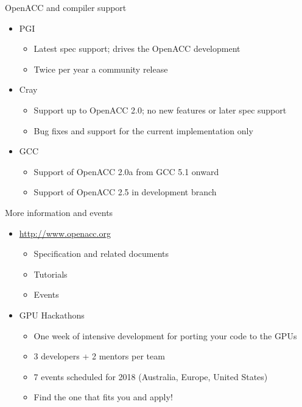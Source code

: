 \documentclass[12pt,aspectratio=169]{beamer}
\begin{document}
\begin{frame}{OpenACC and compiler support}
  \begin{itemize}
  \item PGI
    \begin{itemize}
    \item Latest spec support; drives the OpenACC development
    \item Twice per year a community release
    \end{itemize}
  \item Cray
    \begin{itemize}
    \item Support up to OpenACC 2.0; no new features or later spec support
    \item Bug fixes and support for the current implementation only
    \end{itemize}
  \item GCC
    \begin{itemize}
    \item Support of OpenACC 2.0a from GCC 5.1 onward
    \item Support of OpenACC 2.5 in development branch
    \end{itemize}
  \end{itemize}
\end{frame}

\begin{frame}{More information and events}
  \begin{itemize}
  \item \url{http://www.openacc.org}
    \begin{itemize}
    \item Specification and related documents
    \item Tutorials
    \item Events
    \end{itemize}
    \vfill
  \item GPU Hackathons
    \begin{itemize}
    \item One week of intensive development for porting your code to the GPUs
    \item 3 developers + 2 mentors per team
    \item 7 events scheduled for 2018 (Australia, Europe, United States)
    \item Find the one that fits you and apply!
    \end{itemize}
  \end{itemize}
\end{frame}
\end{document}

